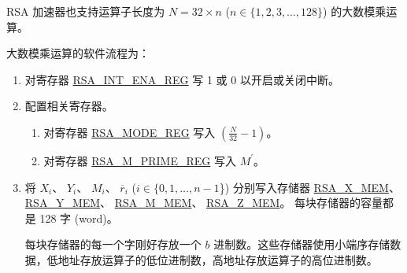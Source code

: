 \documentclass[main\_\_CN.tex]{subfiles}
\begin{document}
RSA 加速器也支持运算子长度为
\begin{math}N = 32 \times n\end{math} (\begin{math}n \in \{ 1,2,3, \dots, 128\} \end{math}) 的大数模乘运算。

大数模乘运算的软件流程为：

\begin{enumerate}

    \item 对寄存器 \hyperref[regdesc:RSAINTENAREG]{RSA\_INT\_ENA\_REG} 写 1 或 0 以开启或关闭中断。

    \item 配置相关寄存器。

    \begin{enumerate}
        \item 对寄存器 \hyperref[regdesc:RSAMODEREG]{RSA\_MODE\_REG} 写入 \begin{math}( \frac{N}{32} - 1 )\end{math}。

        \item 对寄存器 \hyperref[regdesc:RSAMPRIMEREG]{RSA\_M\_PRIME\_REG} 写入 \begin{math}M^{\prime}\end{math}。

    \end{enumerate}

    \item 将
        \begin{math}X_{i}\end{math}、
        \begin{math}Y_{i}\end{math}、
        \begin{math}M_{i}\end{math}、
        \begin{math}\overline{r}_{i}\end{math}
        (\begin{math}i \in \{0, 1, \dots, n-1\end{math}\})
        分别写入存储器
        \hyperref[regdesc:RSAmemory]{RSA\_X\_MEM}、
        \hyperref[regdesc:RSAmemory]{RSA\_Y\_MEM}、
        \hyperref[regdesc:RSAmemory]{RSA\_M\_MEM}、
        \hyperref[regdesc:RSAmemory]{RSA\_Z\_MEM}。
        每块存储器的容量都是 128 字 (word)。

        每块存储器的每一个字刚好存放一个 \begin{math}b\end{math} 进制数。这些存储器使用小端序存储数据，低地址存放运算子的低位进制数，高地址存放运算子的高位进制数。


\end{enumerate}
\end{document}
